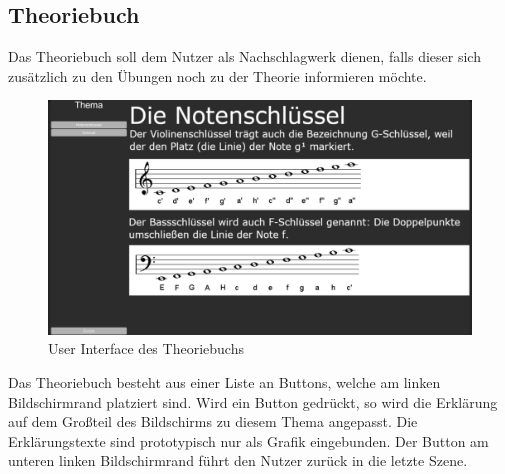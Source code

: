 \subsection*{Theoriebuch}
Das Theoriebuch soll dem Nutzer als Nachschlagwerk dienen, falls dieser sich zusätzlich zu den Übungen noch zu der Theorie informieren möchte. 
\begin{figure}[H]
    \centering
    \includegraphics[width=1\textwidth]{Bilder/theorie.png}
    \caption{User Interface des Theoriebuchs}
    \label{sec:hps_algo}
\end{figure}
Das Theoriebuch besteht aus einer Liste an Buttons, welche am linken Bildschirmrand platziert sind. Wird ein Button gedrückt, so wird die Erklärung auf dem Großteil des Bildschirms zu diesem Thema angepasst. Die Erklärungstexte sind prototypisch nur als Grafik eingebunden. Der Button am unteren linken Bildschirmrand führt den Nutzer zurück in die letzte Szene. 

\newpage

